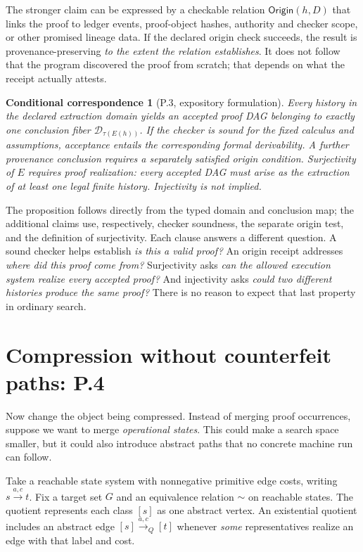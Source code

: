 \documentclass[11pt,letterpaper]{article}
\theoremstyle{plaincompact}
\newtheorem*{proposition}{Conditional correspondence}
\newcommand{\origin}{\mathsf{Origin}}
\begin{document}
The stronger claim can be expressed by a checkable relation $\origin(h,D)$ that links the proof to ledger events, proof-object hashes, authority and checker scope, or other promised lineage data. If the declared origin check succeeds, the result is provenance-preserving \emph{to the extent the relation establishes}. It does not follow that the program discovered the proof from scratch; that depends on what the receipt actually attests.

\begin{proposition}[P.3, expository formulation]
Every history in the declared extraction domain yields an accepted proof DAG belonging to exactly one conclusion fiber $\mathcal D_{\tau(E(h))}$. If the checker is sound for the fixed calculus and assumptions, acceptance entails the corresponding formal derivability. A further provenance conclusion requires a separately satisfied origin condition. Surjectivity of $E$ requires \emph{proof realization}: every accepted DAG must arise as the extraction of at least one legal finite history. Injectivity is not implied.
\end{proposition}

The proposition follows directly from the typed domain and conclusion map; the additional claims use, respectively, checker soundness, the separate origin test, and the definition of surjectivity. Each clause answers a different question. A sound checker helps establish \emph{is this a valid proof?} An origin receipt addresses \emph{where did this proof come from?} Surjectivity asks \emph{can the allowed execution system realize every accepted proof?} And injectivity asks \emph{could two different histories produce the same proof?} There is no reason to expect that last property in ordinary search.

\section{Compression without counterfeit paths: P.4}
Now change the object being compressed. Instead of merging proof occurrences, suppose we want to merge \emph{operational states}. This could make a search space smaller, but it could also introduce abstract paths that no concrete machine run can follow.

Take a reachable state system with nonnegative primitive edge costs, writing $s\xrightarrow{a,c}t$. Fix a target set $G$ and an equivalence relation $\sim$ on reachable states. The quotient represents each class $[s]$ as one abstract vertex. An existential quotient includes an abstract edge $[s]\xrightarrow{a,c}_{Q}[t]$ whenever \emph{some} representatives realize an edge with that label and cost.
\end{document}

